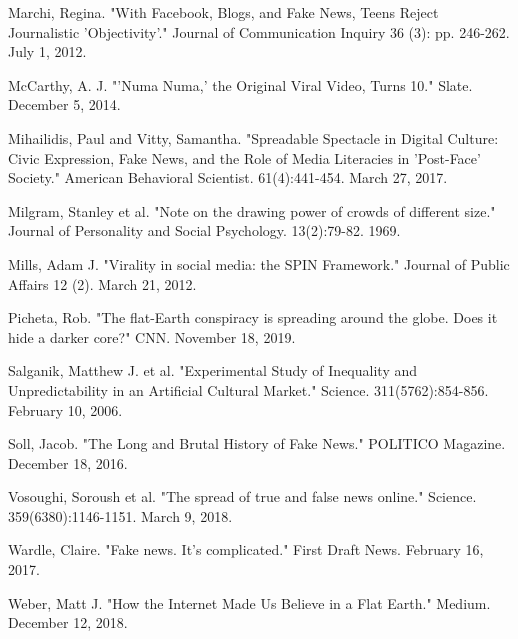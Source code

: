 \documentclass[class=book, crop=false]{standalone}
\begin{document}
Marchi, Regina. "With Facebook, Blogs, and Fake News, Teens Reject Journalistic 'Objectivity'." Journal of Communication Inquiry 36 (3): pp. 246-262. July 1, 2012.

McCarthy, A. J. "'Numa Numa,' the Original Viral Video, Turns 10." Slate. December 5, 2014.

Mihailidis, Paul and Vitty, Samantha. "Spreadable Spectacle in Digital Culture: Civic Expression, Fake News, and the Role of Media Literacies in 'Post-Face' Society." American Behavioral Scientist. 61(4):441-454. March 27, 2017.

Milgram, Stanley et al. "Note on the drawing power of crowds of different size." Journal of Personality and Social Psychology. 13(2):79-82. 1969.

Mills, Adam J. "Virality in social media: the SPIN Framework." Journal of Public Affairs 12 (2). March 21, 2012.

Picheta, Rob. "The flat-Earth conspiracy is spreading around the globe. Does it hide a darker core?" CNN. November 18, 2019.

Salganik, Matthew J. et al. "Experimental Study of Inequality and Unpredictability in an Artificial Cultural Market." Science. 311(5762):854-856. February 10, 2006.

Soll, Jacob. "The Long and Brutal History of Fake News." POLITICO Magazine. December 18, 2016.

Vosoughi, Soroush et al. "The spread of true and false news online." Science. 359(6380):1146-1151. March 9, 2018.

Wardle, Claire. "Fake news. It's complicated." First Draft News. February 16, 2017.

Weber, Matt J. "How the Internet Made Us Believe in a Flat Earth." Medium. December 12, 2018.
\end{document}
